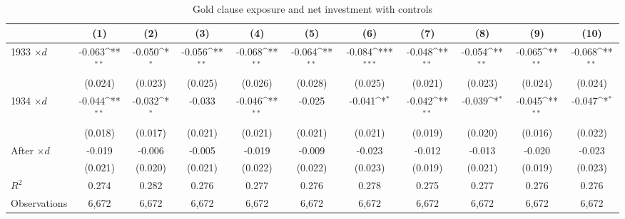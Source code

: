 \begin{table}[p]\centering
\caption{\\ Gold clause exposure and net investment with controls} \scriptsize \label{tab:controls} \renewcommand{\arraystretch}{1.2}
\def\sym#1{\ifmmode^{#1}\else\(^{#1}\)\fi}
\begin{tabular}{lcccccccccc}
\toprule
 & (1) & (2) & (3) & (4) & (5) & (6) & (7) & (8) & (9) & (10) \\
\midrule
1933 $\times d$
  & -0.063\sym{**} & -0.050\sym{*} & -0.056\sym{**} & -0.068\sym{**} & -0.064\sym{**} & -0.084\sym{***} & -0.048\sym{**} & -0.054\sym{**} & -0.065\sym{**} & -0.068\sym{**} \\
  & (0.024)        & (0.023)       & (0.025)        & (0.026)        & (0.028)        & (0.025)         & (0.021)        & (0.023)        & (0.024)        & (0.024)        \\[0.35em]

1934 $\times d$
  & -0.044\sym{**} & -0.032\sym{*} & -0.033          & -0.046\sym{**} & -0.025          & -0.041\sym{*}   & -0.042\sym{**} & -0.039\sym{*}  & -0.045\sym{**} & -0.047\sym{*}  \\
  & (0.018)        & (0.017)       & (0.021)         & (0.021)        & (0.021)         & (0.021)         & (0.019)        & (0.020)        & (0.016)        & (0.022)        \\[0.35em]

After $\times d$
  & -0.019          & -0.006         & -0.005          & -0.019          & -0.009          & -0.023          & -0.012          & -0.013          & -0.020          & -0.023          \\
  & (0.021)         & (0.020)        & (0.021)         & (0.022)         & (0.022)         & (0.023)         & (0.019)         & (0.021)         & (0.019)         & (0.023)         \\
\midrule
$R^2$         & 0.274 & 0.282 & 0.276 & 0.277 & 0.276 & 0.278 & 0.275 & 0.277 & 0.276 & 0.276 \\
Observations  & 6{,}672 & 6{,}672 & 6{,}672 & 6{,}672 & 6{,}672 & 6{,}672 & 6{,}672 & 6{,}672 & 6{,}672 & 6{,}672 \\
\bottomrule
\end{tabular}\\


\end{table}
